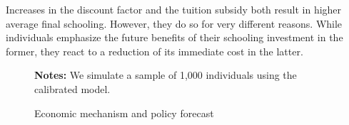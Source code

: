 Increases in the discount factor and the tuition subsidy both result in higher average final schooling. However, they do so for very different reasons. While individuals emphasize the future benefits of their schooling investment in the former, they react to a reduction of its immediate cost in the latter.

\begin{figure}[h!]\centering
	\caption{Economic mechanism and policy forecast}\label{Economic mechanism and policy forecast}
	\hspace{0.3cm}
	\begin{center}
		\begin{minipage}[t]{0.675\columnwidth}
			\item \scriptsize{\textbf{Notes:} We simulate a sample of 1,000 individuals using the calibrated model.}
		\end{minipage}
	\end{center}
\end{figure}%
